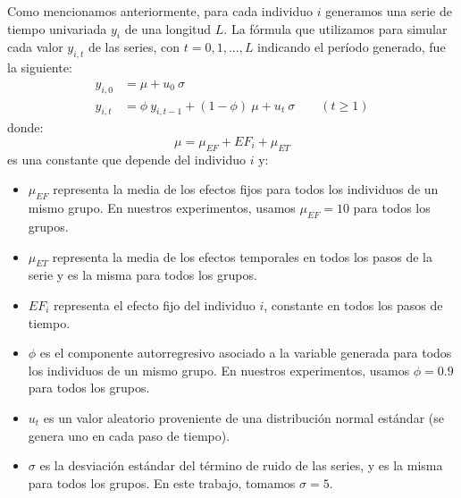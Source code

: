 \documentclass[../../main.tex]{subfiles}
\begin{document}
Como mencionamos anteriormente, para cada individuo \(i\) generamos una serie de tiempo
univariada \(y_i\) de una longitud \(L\). La fórmula que utilizamos para simular cada
valor \(y_{i,t}\) de las series, con \(t = 0, 1, ..., L\) indicando el período generado,
fue la siguiente:
\begin{align}
    y_{i,0} &= \mu + u_0  \ \sigma \\
    y_{i,t} &= \phi \ y_{i,t-1} + (1 - \phi) \ \mu +  u_t \ \sigma \qquad (t \ge 1)
\end{align}
donde:
\[
    \mu = \mu_{EF} + EF_i + \mu_{ET}
\]
es una constante que depende del individuo \(i\) y:
\begin{itemize}[itemsep=0.1cm]
    \item \(\mu_{EF}\) representa la media de los efectos fijos para todos los individuos
    de un mismo grupo. En nuestros experimentos, usamos \(\mu_{EF} = 10\) para todos los
    grupos.
    \item \(\mu_{ET}\) representa la media de los efectos temporales en todos los pasos
    de la serie y es la misma para todos los grupos.
    \item \(EF_i\) representa el efecto fijo del individuo \(i\), constante en todos
    los pasos de tiempo.
    \item \(\phi\) es el componente autorregresivo asociado a la variable generada para
    todos los individuos de un mismo grupo. En nuestros experimentos, usamos \(\phi = 0.9\)
    para todos los grupos.
    \item \(u_t\) es un valor aleatorio proveniente de una distribución normal estándar
    (se genera uno en cada paso de tiempo).
    \item \(\sigma\) es la desviación estándar del término de ruido de las series,
    y es la misma para todos los grupos. En este trabajo, tomamos \(\sigma=5\).
\end{itemize}
\end{document}

